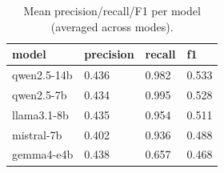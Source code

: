 \begin{table}[ht]
\centering
\caption{Mean precision/recall/F1 per model (averaged across modes).}
\label{tab:per_model}
\begin{tabular}{llll}
\toprule
model & precision & recall & f1 \\
\midrule
qwen2.5-14b & 0.436 & 0.982 & 0.533 \\
qwen2.5-7b & 0.434 & 0.995 & 0.528 \\
llama3.1-8b & 0.435 & 0.954 & 0.511 \\
mistral-7b & 0.402 & 0.936 & 0.488 \\
gemma4-e4b & 0.438 & 0.657 & 0.468 \\
\bottomrule
\end{tabular}
\end{table}
